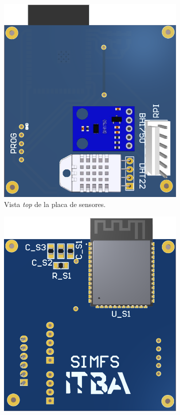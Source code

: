 \begin{figure}[H]
\centering
	\begin{subfigure}{0.48\textwidth}
    	\centering
    	\includegraphics[width=\linewidth,page=5]{ImagenesIngenieria de Detalle/sensores_top}
  		\caption{Vista \textit{top} de la placa de sensores.}
  		\label{fig:sensores_top}
    \end{subfigure}\hfill
    \begin{subfigure}{0.48\textwidth}
    	\centering
    	\includegraphics[width=\linewidth,page=6]{ImagenesIngenieria de Detalle/sensores_bot}

\end{subfigure}
\end{figure}
